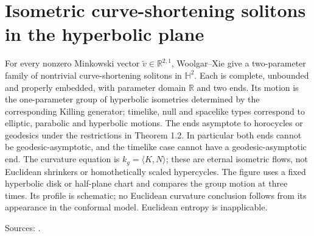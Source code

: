 \chapter{Isometric curve-shortening solitons in the hyperbolic plane}\label{sec:catalogue-hyperbolic-curve-solitons}
\begin{example}\label{ex:catalogue-hyperbolic-curve-solitons}
For every nonzero Minkowski vector $\widetilde v\in\mathbb R^{2,1}$, Woolgar--Xie give a two-parameter family of nontrivial curve-shortening solitons in $\mathbb H^2$. Each is complete, unbounded and properly embedded, with parameter domain $\mathbb R$ and two ends. Its motion is the one-parameter group of hyperbolic isometries determined by the corresponding Killing generator; timelike, null and spacelike types correspond to elliptic, parabolic and hyperbolic motions.
The ends asymptote to horocycles or geodesics under the restrictions in Theorem 1.2. In particular both ends cannot be geodesic-asymptotic, and the timelike case cannot have a geodesic-asymptotic end. The curvature equation is $k_g=\langle K,N\rangle$; these are eternal isometric flows, not Euclidean shrinkers or homothetically scaled hypercycles. The figure uses a fixed hyperbolic disk or half-plane chart and compares the group motion at three times. Its profile is schematic; no Euclidean curvature conclusion follows from its appearance in the conformal model. Euclidean entropy is inapplicable.
\par Sources: \cite{CatWoolgarXie2022}.
\end{example}

